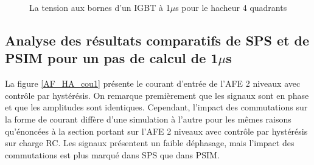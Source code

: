 \begin{figure}[htb]
\caption{La tension aux bornes d'un IGBT à 1$\mu$s pour le hacheur 4 quadrants}
\label{AF_HA_HAV1}
\end{figure}



\clearpage

\subsection{Analyse des résultats comparatifs de SPS et de PSIM pour un pas de calcul de 1$\mu$s}

La figure \ref{AF_HA_cou1} présente le courant d'entrée de l'AFE 2 niveaux avec contrôle par hystérésis. On remarque premièrement que les signaux sont en phase et que les amplitudes sont identiques. Cependant, l'impact des commutations sur la forme de courant diffère d'une simulation à l'autre pour les mêmes raisons qu'énoncées à la section portant sur l'AFE 2 niveaux avec contrôle par hystérésis sur charge RC. Les signaux présentent un faible déphasage, mais l'impact des commutations est plus marqué dans SPS que dans PSIM.

